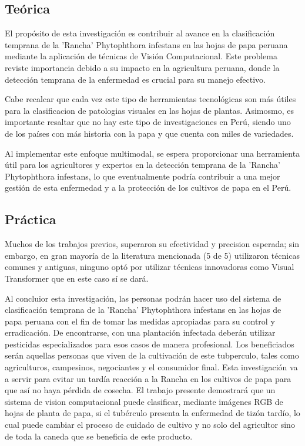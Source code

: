 \subsection{Teórica}
El propósito de esta investigación es contribuir al avance en la clasificación temprana de la 'Rancha' Phytophthora infestans en las hojas de papa peruana mediante la aplicación de técnicas de Visión Computacional. Este problema reviste importancia debido a su impacto en la agricultura peruana, donde la detección temprana de la enfermedad es crucial para su manejo efectivo.

Cabe recalcar que cada vez este tipo de herramientas tecnológicas son más útiles para la clasificacion de patologias visuales en las hojas de plantas. Asimosmo, es importante resaltar que no hay este tipo de investigaciones en Perú, siendo uno de los países con más historia con la papa y que cuenta con miles de variedades.

Al implementar este enfoque multimodal, se espera proporcionar una herramienta útil para los agricultores y expertos en la detección temprana de la 'Rancha' Phytophthora infestans, lo que eventualmente podría contribuir a una mejor gestión de esta enfermedad y a la protección de los cultivos de papa en el Perú. 
\subsection{Práctica}
Muchos de los trabajos previos, superaron su efectividad y precision esperada; sin embargo, en gran mayoría de la literatura mencionada (5 de 5) utilizaron técnicas comunes y antiguas, ninguno optó por utilizar técnicas innovadoras como Visual Transformer que en este caso sí se dará.


Al concluior esta investigación, las personas podrán hacer uso del sistema de clasificación temprana de la 'Rancha' Phytophthora infestans en las hojas de papa peruana con el fin de tomar las medidas apropiadas para su control y erradicación. De encontrarse, con una plantación infectada deberán utilizar pesticidas especializados para esos casos de manera profesional. Los beneficiados serán aquellas personas que viven de la cultivación de este tubperculo, tales como agriculturos, campesinos, negociantes y el consumidor final. Esta investigación va a servir para evitar un tardía reacción a la Rancha en los cultivos de papa para que así no haya pérdida de cosecha. El trabajo presente demostrará que un sistema de vision computacional puede clasificar, mediante imágenes RGB de hojas de planta de papa, si el tubérculo presenta la enfermedad de tizón tardío, lo cual puede cambiar el proceso de cuidado de cultivo y no solo del agricultor sino de toda la caneda que se beneficia de este producto.

